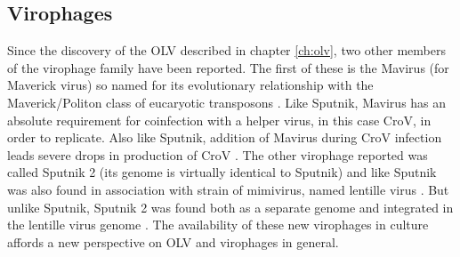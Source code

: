 \subsection{Virophages}
Since the discovery of the \ac{OLV} described in chapter \ref{ch:olv}, two other members of the virophage family have been reported.
The first of these is the Mavirus (for Maverick virus) so named for its evolutionary relationship with the Maverick/Politon class of eucaryotic transposons \cite{Fischer2011}.
Like Sputnik, Mavirus has an absolute requirement for coinfection with a helper virus, in this case \ac{CroV}, in order to replicate.
Also like Sputnik, addition of Mavirus during \ac{CroV} infection leads severe drops in production of \ac{CroV} \cite{Fischer2011}.
The other virophage reported was called Sputnik 2 (its genome is virtually identical to Sputnik) and like Sputnik was also found in association with strain of mimivirus, named lentille virus \cite{Desnues2012}.
But unlike Sputnik, Sputnik 2 was found both as a separate genome and integrated in the lentille virus genome \cite{Desnues2012}.
The availability of these new virophages in culture affords a new perspective on \ac{OLV} and virophages in general.


